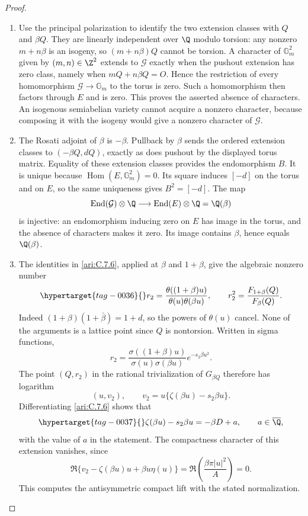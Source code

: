 \begin{proof}
\begin{enumerate}[label=\arabic*.,leftmargin=*]
\item Use the principal polarization to identify the two extension
classes with $Q$ and $\beta Q$. They are linearly independent
over $\Q$ modulo torsion: any nonzero $m+n\beta$ is an
isogeny, so $(m+n\beta)Q$ cannot be torsion. A character
of $\mathbb G_m^2$ given by $(m,n)\in\Z^2$ extends to
$\mathcal G$ exactly when the pushout extension has zero
class, namely when $mQ+n\beta Q=O$. Hence the restriction
of every homomorphism $\mathcal G\to\mathbb G_m$ to
the torus is zero. Such a homomorphism then factors through
$E$ and is zero. This proves the asserted absence of
characters. An isogenous semiabelian variety cannot acquire
a nonzero character, because composing it with the isogeny
would give a nonzero character of $\mathcal G$.

\item The Rosati adjoint of $\beta$ is $-\beta$. Pullback by
$\beta$ sends the ordered extension classes to
$(-\beta Q,dQ)$, exactly as does pushout by the displayed
torus matrix. Equality of these extension classes provides
the endomorphism $B$. It is unique because
$\operatorname{Hom}(E,\mathbb G_m^2)=0$. Its square
induces $[-d]$ on the torus and on $E$, so the same
uniqueness gives $B^2=[-d]$. The map
\[
 \operatorname{End}(\mathcal G)\otimes\Q
     \longrightarrow\operatorname{End}(E)\otimes\Q
          =\Q(\beta)
\]
is injective: an endomorphism inducing zero on $E$ has image
in the torus, and the absence of characters makes it zero.
Its image contains $\beta$, hence equals $\Q(\beta)$.

\item The identities in \ref{ari:C.7.6}, applied at $\beta$
and $1+\beta$, give the algebraic nonzero number
\begin{equation}\hypertarget{tag-0036}{}\label{ari:eq:ce-ribet-r}
 r_2=\frac{\theta((1+\beta)u)}{\theta(u)\theta(\beta u)},
 \qquad r_2^2=\frac{F_{1+\beta}(Q)}{F_\beta(Q)}.
\end{equation}
Indeed $(1+\beta)(1+\bar\beta)=1+d$, so the powers
of $\theta(u)$ cancel. None of the arguments is a lattice
point since $Q$ is nontorsion. Written in sigma functions,
\[
 r_2=\frac{\sigma((1+\beta)u)}{\sigma(u)\sigma(\beta u)}
                         e^{-s_2\beta u^2}.
\]
The point $(Q,r_2)$ in the rational trivialization of
$G_{\beta Q}$ therefore has logarithm
\[
 (u,v_2),\qquad
 v_2=u\{\zeta(\beta u)-s_2\beta u\}.
\]
Differentiating \ref{ari:C.7.6} shows that
\begin{equation}\hypertarget{tag-0037}{}\label{ari:eq:ce-zeta}
 \zeta(\beta u)-s_2\beta u=-\beta D+a,
 \qquad a\in\overline\Q,
\end{equation}
with the value of $a$ in the statement. The compactness
character of this extension vanishes, since
\[
 \Re\{v_2-\zeta(\beta u)u+\beta u\eta(u)\}
    =\Re\left(\frac{\beta\pi|u|^2}{A}\right)=0.
\]
This computes the antisymmetric compact lift with the stated normalization.


\end{enumerate}
\end{proof}
